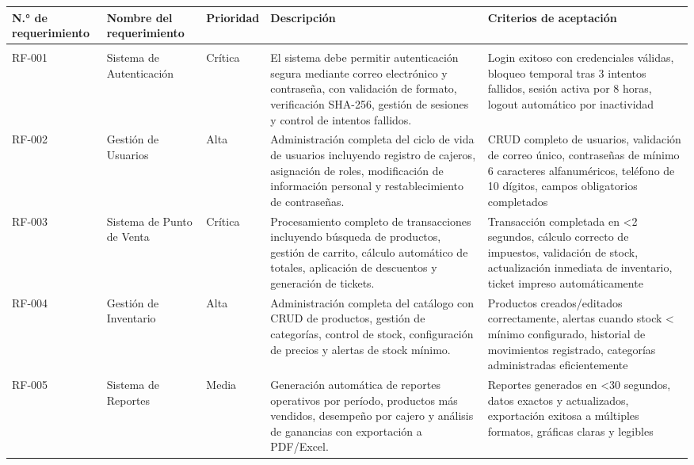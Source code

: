 \documentclass[12pt,letterpaper]{article}
\begin{document}
\begin{longtable}{|>{\centering}p{1.5cm}|p{3.5cm}|>{\centering}p{2cm}|p{6.5cm}|>{\centering\arraybackslash}p{2.5cm}|}
\hline
\rowcolor{cobrablue!20}
\textbf{N.° de requerimiento} & \textbf{Nombre del requerimiento} & \textbf{Prioridad} & \textbf{Descripción} & \textbf{Criterios de aceptación} \\
\hline
\endhead

\multicolumn{5}{|c|}{\cellcolor{cobraorange!20}\textbf{FASE 1: APLICACIÓN DE ESCRITORIO}} \\
\hline

RF-001 & Sistema de Autenticación & Crítica & El sistema debe permitir autenticación segura mediante correo electrónico y contraseña, con validación de formato, verificación SHA-256, gestión de sesiones y control de intentos fallidos. & Login exitoso con credenciales válidas, bloqueo temporal tras 3 intentos fallidos, sesión activa por 8 horas, logout automático por inactividad \\
\hline

RF-002 & Gestión de Usuarios & Alta & Administración completa del ciclo de vida de usuarios incluyendo registro de cajeros, asignación de roles, modificación de información personal y restablecimiento de contraseñas. & CRUD completo de usuarios, validación de correo único, contraseñas de mínimo 6 caracteres alfanuméricos, teléfono de 10 dígitos, campos obligatorios completados \\
\hline

RF-003 & Sistema de Punto de Venta & Crítica & Procesamiento completo de transacciones incluyendo búsqueda de productos, gestión de carrito, cálculo automático de totales, aplicación de descuentos y generación de tickets. & Transacción completada en <2 segundos, cálculo correcto de impuestos, validación de stock, actualización inmediata de inventario, ticket impreso automáticamente \\
\hline

RF-004 & Gestión de Inventario & Alta & Administración completa del catálogo con CRUD de productos, gestión de categorías, control de stock, configuración de precios y alertas de stock mínimo. & Productos creados/editados correctamente, alertas cuando stock < mínimo configurado, historial de movimientos registrado, categorías administradas eficientemente \\
\hline

RF-005 & Sistema de Reportes & Media & Generación automática de reportes operativos por período, productos más vendidos, desempeño por cajero y análisis de ganancias con exportación a PDF/Excel. & Reportes generados en <30 segundos, datos exactos y actualizados, exportación exitosa a múltiples formatos, gráficas claras y legibles \\
\hline


\end{longtable}
\end{document}

